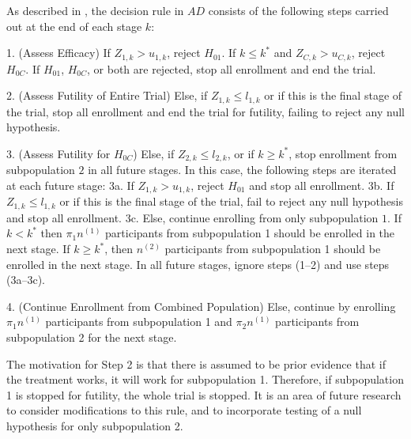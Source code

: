 \documentclass[article]{jss}
\begin{document}

As described in \citep{Rosenblum2013AdaptMISTIE}, the decision rule in $AD$ consists of the following steps carried out at the end of each stage $k$:

\begin{description}
\item 1. (Assess Efficacy) 
 If $Z_{1,k}>u_{1,k}$, reject $H_{01}$.
   If $k\leq k^*$ and  $Z_{C,k} > u_{C,k}$, reject $H_{0C}$. 
 If $H_{01}$, $H_{0C}$, or both  are rejected, stop all enrollment and end the trial.
\item 2. (Assess Futility of Entire Trial) Else, if $Z_{1,k} ≤ l_{1,k}$ or if this is the final stage of the trial, stop all enrollment and end the trial for futility, failing to reject  any null hypothesis.
\item 3. (Assess Futility for $H_{0C}$) Else, if $Z_{2,k} ≤ l_{2,k}$, or if $k\geq k^*$, stop enrollment from subpopulation $2$ in all future stages. In this case, the following steps are iterated at each future stage:
	\subitem  3a. If $Z_{1,k} > u_{1,k}$, reject $H_{01}$ and stop all enrollment.
	\subitem  3b. If $Z_{1,k} ≤ l_{1,k}$ or if this is the final stage of the trial, fail to reject any null hypothesis  and stop all enrollment.
	\subitem  3c. Else, continue enrolling from only subpopulation $1$. If $k < k^*$ then $π_1n^{(1)}$ participants from subpopulation 1 should be enrolled in the next stage. If $k \geq k^*$, then $n^{(2)}$ participants from subpopulation 1 should be enrolled in the next stage. In all future stages, ignore steps (1--2) and use steps (3a--3c).
\item  4. (Continue Enrollment from Combined Population) Else, continue by enrolling $\pi_1 n^{(1)}$ participants from subpopulation 1 and $\pi_2 n^{(1)}$ participants from subpopulation 2 for the next stage.
\end{description}

The motivation for Step 2 is that there is assumed to be prior evidence that if the treatment works, it will work for subpopulation 1. Therefore, if subpopulation 1 is stopped for futility, the whole trial is stopped. It is an area of future research to consider modifications to this rule, and to incorporate testing of a null hypothesis for only subpopulation 2.
\end{document}
